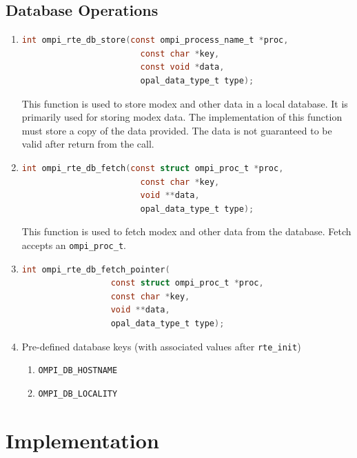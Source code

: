 \subsection{Database Operations}
\begin{enumerate}
\item
  \begin{lstlisting}[language=C]
  int ompi_rte_db_store(const ompi_process_name_t *proc,
                        const char *key,
                        const void *data,
                        opal_data_type_t type);
  \end{lstlisting}
  This function is used to store modex and other data in a local database. It is primarily used for storing modex data. The implementation of this function must store a copy of the data provided. The data is not guaranteed to be valid after return from the call.

\item
  \begin{lstlisting}[language=C]
  int ompi_rte_db_fetch(const struct ompi_proc_t *proc,
                        const char *key,
                        void **data,
                        opal_data_type_t type);
  \end{lstlisting}
  This function is used to fetch modex and other data from the database. Fetch accepts an \verb|ompi_proc_t|.

\item
  \begin{lstlisting}[language=C]
  int ompi_rte_db_fetch_pointer(
                  const struct ompi_proc_t *proc,
                  const char *key,
                  void **data,
                  opal_data_type_t type);  
  \end{lstlisting}
    
\item Pre-defined database keys (with associated values after \verb|rte_init|)
  \begin{enumerate}
    \item \verb|OMPI_DB_HOSTNAME|
    \item \verb|OMPI_DB_LOCALITY|
  \end{enumerate}
\end{enumerate}


\section{Implementation}
\label{sec:implementation}

